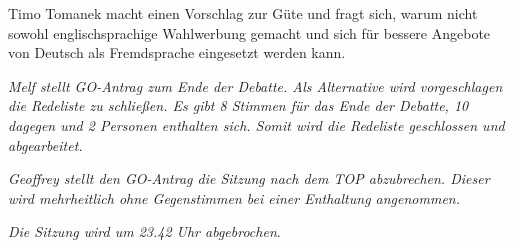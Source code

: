 \documentclass[ngerman,headheight=70pt]{scrartcl}
\begin{document}
    Timo Tomanek macht einen Vorschlag zur Güte und fragt sich, warum nicht
    sowohl englischsprachige Wahlwerbung gemacht und sich für bessere
    Angebote von Deutsch als Fremdsprache eingesetzt werden kann.

    \textit{Melf stellt GO-Antrag zum Ende der Debatte. Als Alternative wird
    vorgeschlagen die Redeliste zu schließen. Es gibt 8 Stimmen für das Ende
    der Debatte, 10 dagegen und 2 Personen enthalten sich. Somit wird die
    Redeliste geschlossen und abgearbeitet.}

    \textit{Geoffrey stellt den GO-Antrag die Sitzung nach dem TOP abzubrechen.
    Dieser wird mehrheitlich ohne Gegenstimmen bei einer Enthaltung angenommen.}

    \textit{Die Sitzung wird um 23.42 Uhr abgebrochen}.
\end{document}

